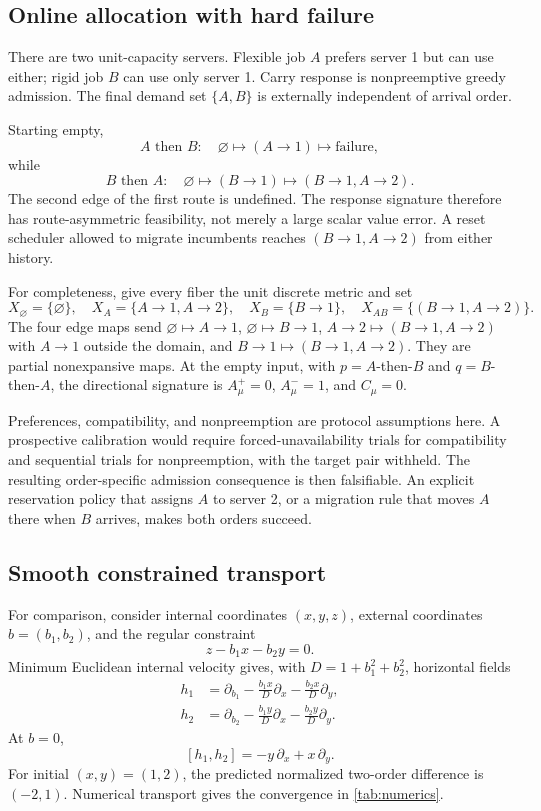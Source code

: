 \documentclass[11pt]{article}
\theoremstyle{definition}
\theoremstyle{remark}
\begin{document}
\subsection{Online allocation with hard failure}

There are two unit-capacity servers. Flexible job \(A\) prefers server 1 but
can use either; rigid job \(B\) can use only server 1. Carry response is
nonpreemptive greedy admission. The final demand set \(\{A,B\}\) is externally
independent of arrival order.

Starting empty,
\[
A\text{ then }B:
\quad \varnothing\mapsto(A\to1)\mapsto\text{failure},
\]
while
\[
B\text{ then }A:
\quad \varnothing\mapsto(B\to1)\mapsto(B\to1,A\to2).
\]
The second edge of the first route is undefined. The response signature
therefore has route-asymmetric feasibility, not merely a large scalar value
error. A reset scheduler allowed to migrate incumbents reaches
\((B\to1,A\to2)\) from either history.

For completeness, give every fiber the unit discrete metric and set
\[
X_\varnothing=\{\varnothing\},\quad
X_A=\{A\to1,A\to2\},\quad
X_B=\{B\to1\},\quad
X_{AB}=\{(B\to1,A\to2)\}.
\]
The four edge maps send
\(\varnothing\mapsto A\to1\),
\(\varnothing\mapsto B\to1\),
\(A\to2\mapsto(B\to1,A\to2)\) with \(A\to1\) outside the domain, and
\(B\to1\mapsto(B\to1,A\to2)\). They are partial nonexpansive maps. At the
empty input, with \(p=A\)-then-\(B\) and \(q=B\)-then-\(A\), the directional
signature is \(A_\mu^+=0\), \(A_\mu^-=1\), and \(C_\mu=0\).

Preferences, compatibility, and nonpreemption are protocol assumptions here.
A prospective calibration would require forced-unavailability trials for
compatibility and sequential trials for nonpreemption, with the target pair
withheld. The resulting order-specific admission consequence is then
falsifiable. An explicit reservation policy that assigns \(A\) to server 2,
or a migration rule that moves \(A\) there when \(B\) arrives, makes both
orders succeed.

\subsection{Smooth constrained transport}

For comparison, consider internal coordinates \((x,y,z)\), external
coordinates \(b=(b_1,b_2)\), and the regular constraint
\[
z-b_1x-b_2y=0.
\]
Minimum Euclidean internal velocity gives, with
\(D=1+b_1^2+b_2^2\), horizontal fields
\begin{align*}
h_1&=\partial_{b_1}
-\frac{b_1x}{D}\partial_x-\frac{b_2x}{D}\partial_y,\\
h_2&=\partial_{b_2}
-\frac{b_1y}{D}\partial_x-\frac{b_2y}{D}\partial_y.
\end{align*}
At \(b=0\),
\[
[h_1,h_2]=-y\,\partial_x+x\,\partial_y.
\]
For initial \((x,y)=(1,2)\), the predicted normalized two-order difference is
\((-2,1)\). Numerical transport gives the convergence in
\cref{tab:numerics}.
\end{document}
